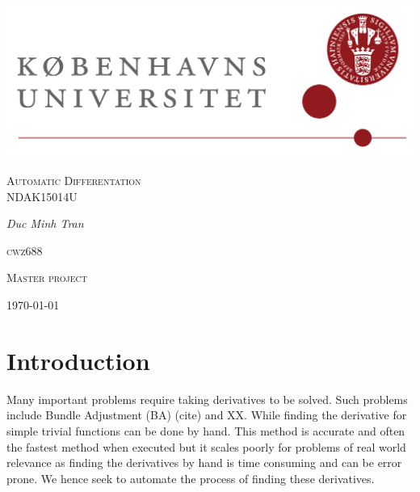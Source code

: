 

\author{Minh}

	\begin{titlepage}
		\centering
		\includegraphics[width=\textwidth]{KuLogo.png}
		\par\vspace{1cm}
		\vspace{1cm}
		{\scshape\Large Automatic Differentation \\
			NDAK15014U\par}
		\vspace{1.5cm}
		{\Large\itshape Duc Minh Tran }\\
		\vspace{0.5cm}
		{\scshape\large cwz688 \\ \par}
		\vfill
		{\Large\scshape Master project \par}
		\vfill
		\par
		\vfill
		{\large \today\par}
	\end{titlepage}
	\newpage
\begin{abstract}
	Automatic diff is good
\end{abstract}
\section{Introduction}
Many important problems require taking derivatives to be solved. Such problems include 
Bundle Adjustment (BA) (cite) and XX. While finding the derivative for simple trivial functions 
can be done by hand. This method is accurate and often the 
fastest method when executed but it scales poorly for problems of real world relevance as 
finding the derivatives by hand is time consuming and can be error prone.  We hence seek to 
automate the process of finding these derivatives. \newline 

